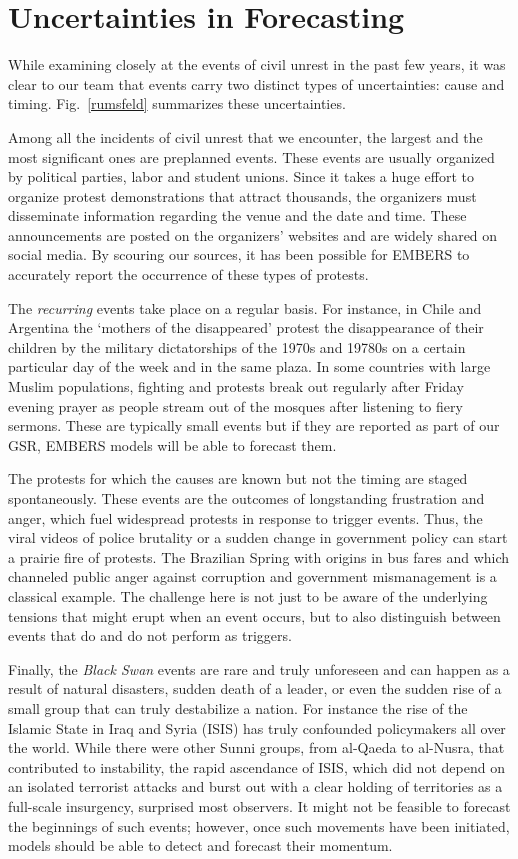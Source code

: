 \section{Uncertainties in Forecasting}
While examining closely at the events of civil unrest in the past few years, it was clear to our
team that events carry two distinct types of uncertainties: cause and timing.  
Fig.~\ref{rumsfeld} summarizes these uncertainties.

Among all the incidents of civil unrest that we encounter, the largest and the most significant ones 
are preplanned events.  These events are usually organized by political parties, labor and student unions.  
Since it takes a huge effort to organize protest demonstrations that 
attract thousands, the organizers must disseminate information regarding the venue 
and the date and time.  These announcements are posted on the organizers’ websites and 
are widely shared on social media.  By scouring our sources,
it has been possible for EMBERS to accurately report the occurrence of these types of protests.

The {\it recurring} events take place on a regular basis.  For instance, in Chile and Argentina the 
`mothers of the disappeared' protest the disappearance of their children by the military dictatorships 
of the 1970s and 19780s on a certain particular day of the week and in the same plaza. 
In some countries with large Muslim populations, fighting and protests break out regularly after 
Friday evening prayer as people stream out of the mosques after listening 
to fiery sermons. These are typically small events but if they are reported as part of our GSR,
EMBERS models will be able to forecast them.

The protests for which the causes are known but not the timing are staged spontaneously.  These 
events are the outcomes of longstanding frustration and anger, which fuel widespread 
protests in response to trigger events.  Thus, the viral videos of police brutality or 
a sudden change in government policy can start a prairie fire of protests.  The Brazilian
Spring with origins in bus fares and which channeled
public anger against corruption and government mismanagement is a classical example. The challenge here
is not just to be aware of the underlying tensions that might erupt when an event occurs, but to also
distinguish between events that do and do not perform as triggers. 

Finally, the {\it Black Swan} events are rare and truly unforeseen and can happen as a 
result of natural disasters, sudden death of a leader, or even the sudden rise of a 
small group that can truly destabilize a nation.  For instance the rise of the
Islamic State in Iraq and Syria (ISIS) has truly confounded policymakers all over the world.  
While there were other Sunni groups, from al-Qaeda to al-Nusra, that contributed to
instability, the rapid ascendance of ISIS, which did not depend on an isolated terrorist attacks and 
burst out with a clear holding of territories as a full-scale insurgency, surprised most observers.   
It might not be feasible to forecast the beginnings of such events; however, once such movements
have been initiated, models should be able to detect and forecast their momentum.  



